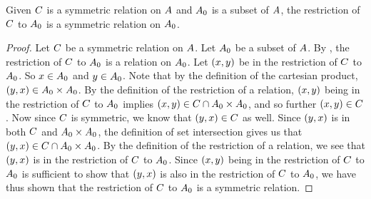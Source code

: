 \documentclass[../main.tex]{subfiles}
\begin{document}
\begin{thm}
	Given \({C}\) is a symmetric relation on \({A}\) and
	\({A_0}\) is a subset of \({A}\), the restriction of
	\({C}\) to \({A_0}\) is a symmetric relation on
	\({A_0}\).
\end{thm}
\begin{proof}
	Let \({C}\) be a symmetric relation on \({A}\). Let
	\({A_0}\) be a subset of \({A}\). By ,
	the restriction of \({C}\) to \({A_0}\) is a relation
	on \({A_0}\). Let \(({x},{y})\) be in the restriction of
	\({C}\) to \({A_0}\). So \(x \in {A_0}\) and
	\(y \in {A_0}\). Note that by the definition of
	the cartesian product,
	\(({y},{x}) \in {{A_0}} \times {{A_0}}\).
	By the definition of the restriction of a relation, \(({x},{y})\)
	being in the restriction of \({C}\) to \({A_0}\)
	implies
	\(({x},{y}) \in {{C}} \cap {{{A_0}} \times{{A_0}}}\),
	and so further \(({x},{y}) \in {C}\). Now since
	\({C}\) is symmetric, we know that
	\(({y},{x}) \in {C}\) as well. Since
	\(({y},{x})\) is in both \({C}\) and
	\({{A_0}} \times {{A_0}}\), the definition
	of set intersection gives us that
	\(({y},{x}) \in {{C}} \cap {{{A_0}} \times{{A_0}}}\).
	By the definition of the restriction of a relation, we see that
	\(({y},{x})\) is in the restriction of \({C}\) to
	\({A_0}\). Since \(({x},{y})\) being in the restriction of
	\({C}\) to \({A_0}\) is sufficient to show that
	\(({y},{x})\) is also in the restriction of \({C}\) to
	\({A_0}\), we have thus shown that the restriction of
	\({C}\) to \({A_0}\) is a symmetric relation.
\end{proof}
\end{document}
